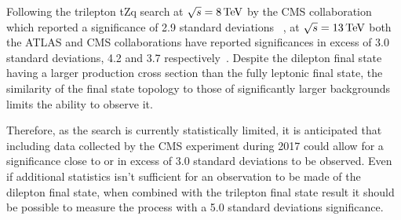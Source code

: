 Following the trilepton tZq search at $\sqrt{s} = 8 \,\text{Te\hspace{-.08em}V}$ by the CMS collaboration which reported a significance of 2.9 standard deviations ~\cite{Sirunyan:2017kkr}, at $\sqrt{s} = 13 \,\text{Te\hspace{-.08em}V}$ both the ATLAS and CMS collaborations  have reported significances in excess of 3.0 standard deviations, 4.2 and 3.7 respectively~\cite{Aaboud:2017ylb,Sirunyan:2017nbr}.
Despite the dilepton final state having a larger production cross section than the fully leptonic final state, the similarity of the final state topology to those of significantly larger backgrounds limits the ability to observe it.

Therefore, as the search  is currently statistically limited, it is anticipated that including data collected by the CMS experiment during 2017 could allow for a significance close to or in excess of 3.0 standard deviations to be observed.
Even if additional statistics isn't sufficient for an observation to be made of the dilepton final state, when combined with the trilepton final state result it should be possible to measure the process with a 5.0 standard deviations significance.
